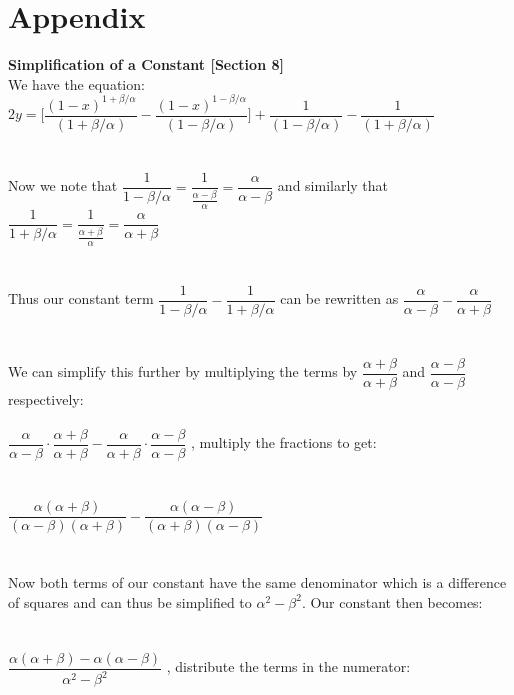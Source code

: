\documentclass[12pt]{article}
\begin{document}
	\clearpage
	
	\section{Appendix}
	
	{\normalsize \textbf{Simplification of a Constant [Section 8]}}
	\\
	
	We have the equation: $2y=\bigg[ \dfrac{(1-x)^{1+\beta/\alpha}}{(1+\beta/\alpha)}-\dfrac{(1-x)^{1-\beta/\alpha}}{(1-\beta/\alpha)} \bigg] +\dfrac{1}{(1-\beta/\alpha)}-\dfrac{1}{(1+\beta/\alpha)}$
	\\
	\\
	\\
	\indent Now we note that $\dfrac{1}{1-\beta/\alpha}=\dfrac{1}{\frac{\alpha-\beta}{\alpha}}=\dfrac{\alpha}{\alpha-\beta}$  and similarly that $\dfrac{1}{1+\beta/\alpha}=\dfrac{1}{\frac{\alpha+\beta}{\alpha}}=\dfrac{\alpha}{\alpha+\beta}$
	\\
	\\
	\\
	\indent Thus our constant term $\dfrac{1}{1-\beta/\alpha} - \dfrac{1}{1+\beta/\alpha}$ can be rewritten as $\dfrac{\alpha}{\alpha-\beta}-\dfrac{\alpha}{\alpha+\beta}$
	\\
	\\
	\\
	\indent We can simplify this further by multiplying the terms by $\dfrac{\alpha+\beta}{\alpha+\beta}$  and $\dfrac{\alpha-\beta}{\alpha-\beta}$  respectively:
	\\
	\\
	$\dfrac{\alpha}{\alpha-\beta}\cdot\dfrac{\alpha+\beta}{\alpha+\beta} -\dfrac{\alpha}{\alpha+\beta}\cdot\dfrac{\alpha-\beta}{\alpha-\beta}$ \hspace{1cm} , multiply the fractions to get:
	\\
	\\
	\\
	$\dfrac{\alpha(\alpha+\beta)}{(\alpha-\beta)(\alpha+\beta)} -\dfrac{\alpha(\alpha-\beta)}{(\alpha+\beta)(\alpha-\beta)}$
	\\
	\\
	\\
	\indent Now both terms of our constant have the same denominator which is a difference of squares and can thus be simplified to $\alpha^2-\beta^2$. Our constant then becomes:
	\\
	\\
	\\
	$\dfrac{\alpha(\alpha+\beta)-\alpha(\alpha-\beta)}{\alpha^2-\beta^2}$ \hspace{1cm} , distribute the terms in the numerator:
\end{document}
